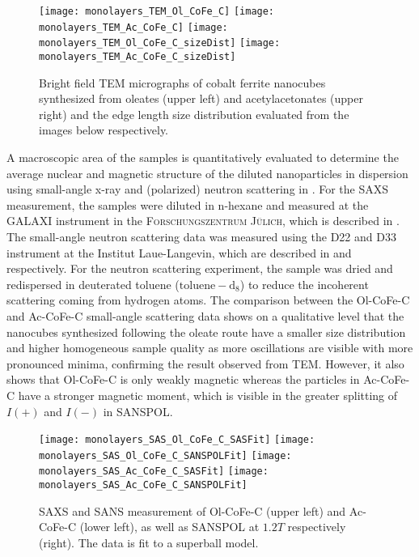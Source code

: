 \documentclass[\main/dresen_thesis.tex]{subfiles}
\begin{document}
    \begin{figure}[tb]
      \centering
      \hspace{0.3 cm}
      \texttt{[image: monolayers\_TEM\_Ol\_CoFe\_C]}
      \hspace{0.3 cm}
      \texttt{[image: monolayers\_TEM\_Ac\_CoFe\_C]}
      \texttt{[image: monolayers\_TEM\_Ol\_CoFe\_C\_sizeDist]}
      \texttt{[image: monolayers\_TEM\_Ac\_CoFe\_C\_sizeDist]}
      \caption{\label{fig:monolayers:nanoparticle:tem}Bright field TEM micrographs of cobalt ferrite nanocubes synthesized from oleates (upper left) and acetylacetonates (upper right) and the edge length size distribution evaluated from the images below respectively.}
    \end{figure}

    A macroscopic area of the samples is quantitatively evaluated to determine the average nuclear and magnetic structure of the diluted nanoparticles in dispersion using small-angle x-ray and (polarized) neutron scattering in .
    For the SAXS measurement, the samples were diluted in n-hexane and measured at the GALAXI instrument in the \textsc{Forschungszentrum J\"ulich}, which is described in .
    The small-angle neutron scattering data was measured using the D22 and D33 instrument at the Institut Laue-Langevin, which are described in  and  respectively.
    For the neutron scattering experiment, the sample was dried and redispersed in deuterated toluene ($\mathrm{toluene-d_8}$) to reduce the incoherent scattering coming from hydrogen atoms.
    The comparison between the Ol-CoFe-C and Ac-CoFe-C small-angle scattering data shows on a qualitative level that the nanocubes synthesized following the oleate route have a smaller size distribution and higher homogeneous sample quality as more oscillations are visible with more pronounced minima, confirming the result observed from TEM.
    However, it also shows that Ol-CoFe-C is only weakly magnetic whereas the particles in Ac-CoFe-C have a stronger magnetic moment, which is visible in the greater splitting of $I(+)$ and $I(-)$ in SANSPOL.

    \begin{figure}[tb]
      \centering
      \texttt{[image: monolayers\_SAS\_Ol\_CoFe\_C\_SASFit]}
      \texttt{[image: monolayers\_SAS\_Ol\_CoFe\_C\_SANSPOLFit]}
      \texttt{[image: monolayers\_SAS\_Ac\_CoFe\_C\_SASFit]}
      \texttt{[image: monolayers\_SAS\_Ac\_CoFe\_C\_SANSPOLFit]}
      \caption{\label{fig:monolayers:nanoparticle:sas:AcOlCoFeC}SAXS and SANS measurement of Ol-CoFe-C (upper left) and Ac-CoFe-C (lower left), as well as SANSPOL at $1.2 \unit{T}$ respectively (right). The data is fit to a superball model.}
    \end{figure}
\end{document}
